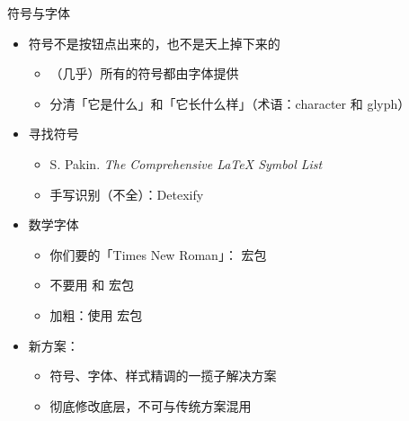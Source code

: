 \begin{frame}{符号与字体}
\begin{itemize}
  \item 符号不是按钮点出来的，也不是天上掉下来的 \pause

    \begin{itemize}
      \item （几乎）所有的符号都由字体提供 \pause
      \item 分清「它是什么」和「它长什么样」（术语：character 和 glyph）
    \end{itemize} \pause

  \item 寻找符号

    \begin{itemize}
      \item S. Pakin. \emph{The Comprehensive \LaTeX{} Symbol List}
      \item 手写识别（不全）：Detexify 
    \end{itemize} \pause

  \item 数学字体

    \begin{itemize}
      \item 你们要的「Times New Roman」： 宏包
      \item \alert{不要用  和  宏包}
      \item 加粗：使用  宏包
    \end{itemize} \pause

  \item 新方案：

    \begin{itemize}
      \item 符号、字体、样式精调的一揽子解决方案
      \item 彻底修改底层，不可与传统方案混用
    \end{itemize}
\end{itemize}
\end{frame}

